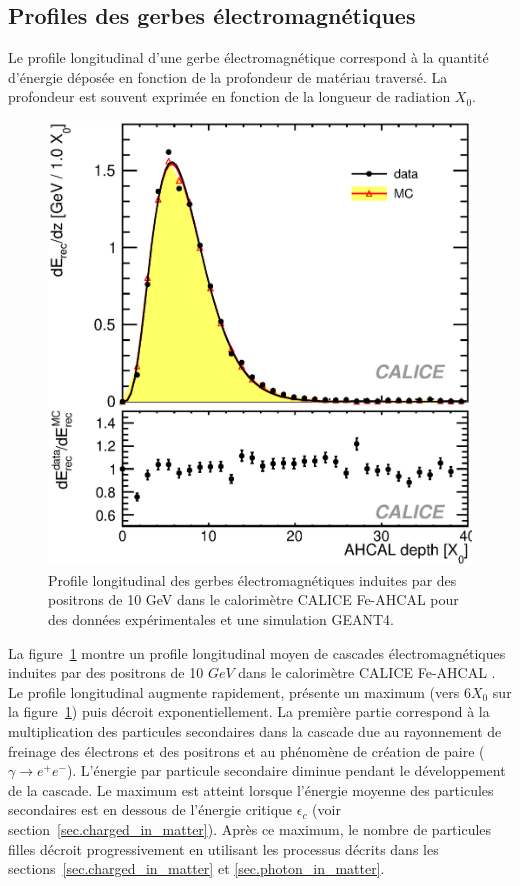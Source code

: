 \subsection{Profiles des gerbes électromagnétiques}
Le profile longitudinal d'une gerbe électromagnétique correspond à la quantité d'énergie déposée en fonction de la profondeur de matériau traversé. La profondeur est souvent exprimée en fonction de la longueur de radiation $X_0$.
\begin{figure}[!h]
  \begin{center}
    \includegraphics[width=.5\textwidth]{ShowerTh/figs/lProfile.eps}
    \caption{Profile longitudinal des gerbes électromagnétiques induites par des positrons de 10 GeV dans le calorimètre CALICE Fe-AHCAL pour des données expérimentales et une simulation GEANT4.}
    \label{fig:lProfile_e-}
  \end{center}
\end{figure}
La figure~\ref{fig:lProfile_e-} montre un profile longitudinal moyen de cascades électromagnétiques induites par des positrons de 10 $GeV$ dans le calorimètre CALICE Fe-AHCAL \cite{1748-0221-6-04-P04003}. Le profile longitudinal augmente rapidement, présente un maximum (vers $6X_0$ sur la figure~\ref{fig:lProfile_e-}) puis décroit exponentiellement. La première partie correspond à la multiplication des particules secondaires dans la cascade due au rayonnement de freinage des électrons et des positrons et au phénomène de création de paire ($\gamma\rightarrow e^+e^-$). L'énergie par particule secondaire diminue pendant le développement de la cascade. Le maximum est atteint lorsque l'énergie moyenne des particules secondaires est en dessous de l'énergie critique $\epsilon_c$ (voir section~\ref{sec.charged_in_matter}). Après ce maximum, le nombre de particules filles décroit progressivement en utilisant les processus décrits dans les sections~\ref{sec.charged_in_matter} et \ref{sec.photon_in_matter}.


